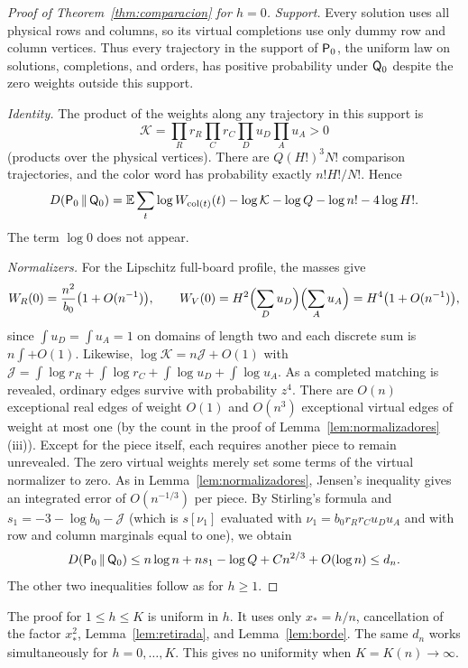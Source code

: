 \begin{proof}[Proof of Theorem~\ref{thm:comparacion} for $h=0$] \emph{Support.} Every solution uses all
physical rows and columns, so
its virtual completions use only dummy row and column vertices. Thus every trajectory in the support of
$\mathsf{P}_0$, the uniform law on
solutions, completions, and orders, has positive probability under $\mathsf{Q}_0$ despite the zero weights outside
this support.

\emph{Identity.} The product of the weights along any trajectory in this support is \[
 \mathcal K=\prod_{R}r_R\prod_{C}r_C\prod_{D}u_D\prod_{A}u_A>0
\] (products over the physical vertices). There are $Q(H!)^3N!$ comparison trajectories, and the color word
has probability exactly
$n!H!/N!$. Hence \[
 D(\mathsf{P}_0\,\Vert\,\mathsf{Q}_0)=\mathbb{E}\sum_t\log W_{\mathrm{col}(t)}(t)-\log\mathcal K-\log Q-\log n!-4\log H! .
\] The term $\log0$ does not appear.

\emph{Normalizers.} For the Lipschitz full-board profile, the masses give \[
 W_R(0)=\frac{n^2}{b_0}\bigl(1+O(n^{-1})\bigr),\qquad
 W_V(0)=H^2\Bigl(\sum_Du_D\Bigr)\Bigl(\sum_Au_A\Bigr)=H^4\bigl(1+O(n^{-1})\bigr),
\] since $\int u_D=\int u_A=1$ on domains of length two and each discrete sum is $n\int+O(1)$. Likewise,
$\log\mathcal K=n\mathcal
J+O(1)$ with $\mathcal J=\int\log r_R+\int\log r_C+\int\log u_D+\int\log
u_A$. As a completed matching is revealed, ordinary edges
survive with probability $z^4$. There are $O(n)$ exceptional real edges of weight $O(1)$ and $O(n^3)$
exceptional virtual edges of
weight at most one (by the count in the proof of Lemma~\ref{lem:normalizadores}(iii)). Except for the piece
itself, each requires another piece to remain unrevealed. The zero virtual weights merely set
some terms of the virtual normalizer to zero. As in Lemma~\ref{lem:normalizadores}, Jensen's inequality
gives an integrated error of
$O(n^{-1/3})$ per piece. By Stirling's formula and $s_1=-3-\log b_0-\mathcal J$ (which is $s[\nu_1]$
evaluated with
$\nu_1=b_0r_Rr_Cu_Du_A$ and with row and column marginals equal to one), we obtain \[
 D(\mathsf{P}_0\,\Vert\,\mathsf{Q}_0)\le n\log n+ns_1-\log Q+Cn^{2/3}+O(\log n)\le d_n .
\] The other two inequalities follow as for $h\ge1$. \end{proof}

\begin{observacion} The proof for $1\le h\le K$ is uniform in $h$. It uses only $x_*=h/n$, cancellation of
the factor $x_*^2$,
Lemma~\ref{lem:retirada}, and Lemma~\ref{lem:borde}. The same $d_n$ works simultaneously for $h=0,\dots,K$.
This gives no uniformity
when $K=K(n)\to\infty$. \end{observacion}
